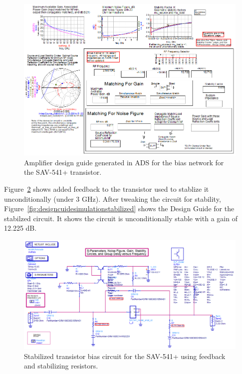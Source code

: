 \documentclass[conference]{IEEEtran}
\begin{document}
\begin{figure}[!h]
\centering
\includegraphics[scale=0.35]{pics/DesignGuideUnoptimized.png}
\caption{Amplifier design guide generated in ADS for the bias network for the SAV-541+ transistor.}
\label{fig:designguide}
\end{figure}

Figure~\ref{fig:designcuidecircuitstabilized} shows added feedback to the transistor used to stablize it unconditionally (under 3 GHz).  After tweaking the circuit for stability, Figure~\ref{fig:designcuidesimulationstabilized} shows the Design Guide for the stabilzed circuit. It shows the circuit is unconditionally stable with a gain of 12.225 dB.

\begin{figure}[!h]
\centering
\includegraphics[scale=0.26]{pics/DesignGuideStablizedCircuit.png}
\caption{Stabilized transistor bias circuit for the SAV-541+ using feedback and stabilizing resistors.}
\label{fig:designcuidecircuitstabilized}
\end{figure}
\end{document}
